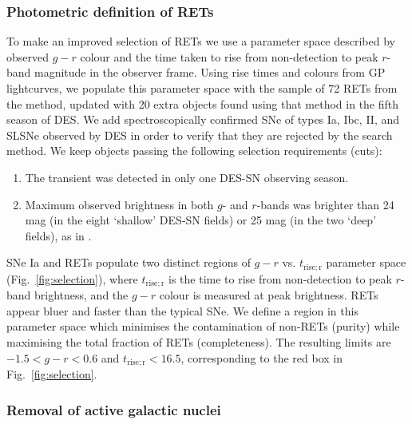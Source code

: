 \documentclass[fleqn,usenatbib,]{mnras}
\begin{document}
\subsubsection{Photometric definition of RETs \label{subsubsec:trise_gr}}
To make an improved selection of RETs we use a parameter space described by observed $g-r$ colour and the time taken to rise from non-detection to peak $r$-band magnitude in the observer frame. Using rise times and colours from GP lightcurves, we populate this parameter space with the sample of 72 RETs from the  method, updated with 20 extra objects found using that method in the fifth season of DES. We add spectroscopically confirmed SNe of types Ia, Ibc, II, and SLSNe observed by DES in order to verify that they are rejected by the search method. We keep objects passing the following selection requirements (cuts):
\begin{enumerate}
\item The transient was detected in only one DES-SN observing season.
\item Maximum observed brightness in both $g$- and $r$-bands was brighter than 24 mag (in the eight `shallow' DES-SN fields) or 25 mag (in the two `deep' fields), as in .
\end{enumerate}

 SNe Ia and RETs populate two distinct regions of $g-r$ vs. $t_{\mathrm{rise; r}}$ parameter space (Fig.~\ref{fig:selection}), where $t_{\mathrm{rise; r}}$ is the time to rise from non-detection to peak $r$-band brightness, and the $g-r$ colour is measured at peak brightness. RETs appear bluer and faster than the typical SNe. We define a region in this parameter space which minimises the contamination of non-RETs (purity) while maximising the total fraction of RETs (completeness). The resulting limits are $-1.5 < g-r < 0.6 $ and $t_{\mathrm{rise; r}} <16.5$, corresponding to the red box in Fig.~\ref{fig:selection}.

\subsubsection{Removal of active galactic nuclei \label{subsubsec:cnn}}
\end{document}
